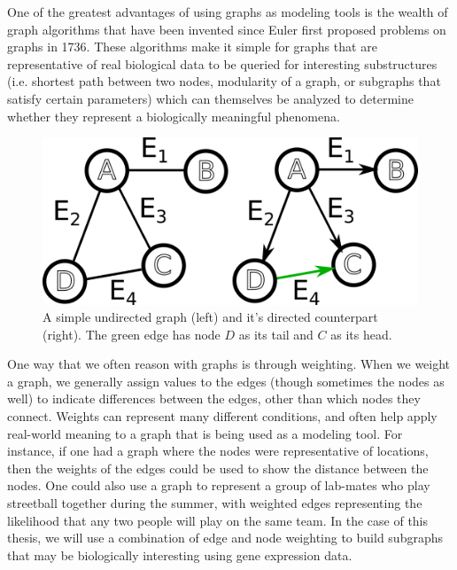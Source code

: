 \documentclass[12pt,twoside]{reedthesis}
\theoremstyle{definition}
\begin{document}
  One of the greatest advantages of using graphs as modeling tools is the wealth of graph algorithms that have been invented since Euler first proposed problems on graphs in 1736. These algorithms make it simple for graphs that are representative of real biological data to be queried for interesting substructures (i.e. shortest path between two nodes, modularity of a graph, or subgraphs that satisfy certain parameters) which can themselves be analyzed to determine whether they represent a biologically meaningful phenomena.\par

  \begin{figure}[!h]
    \begin{center}
      \includegraphics[width=\textwidth/2]{simple_graph_du}
    \caption[Undirected \& Directed Graphs]{A simple undirected graph (left) and it's directed counterpart (right). The green edge has node $D$ as its tail and $C$ as its head.}
    \label{fig:simple_graph_du}
    \end{center}
  \end{figure}

  One way that we often reason with graphs is through weighting. When we weight a graph, we generally assign values to the edges (though sometimes the nodes as well) to indicate differences between the edges, other than which nodes they connect. Weights can represent many different conditions, and often help apply real-world meaning to a graph that is being used as a modeling tool. For instance, if one had a graph where the nodes were representative of locations, then the weights of the edges could be used to show the distance between the nodes. One could also use a graph to represent a group of lab-mates who play streetball together during the summer, with weighted edges representing the likelihood that any two people will play on the same team. In the case of this thesis, we will use a combination of edge and node weighting to build subgraphs that may be biologically interesting using gene expression data.\par
\end{document}

